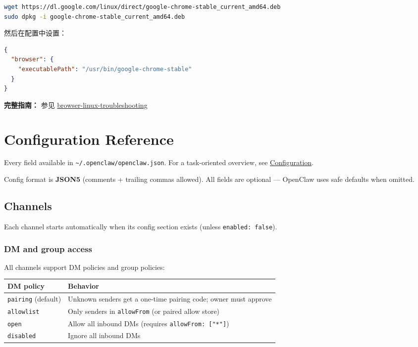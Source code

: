 \begin{lstlisting}[language=bash]
wget https://dl.google.com/linux/direct/google-chrome-stable_current_amd64.deb
sudo dpkg -i google-chrome-stable_current_amd64.deb
\end{lstlisting}


然后在配置中设置：

\begin{lstlisting}[language=json]
{
  "browser": {
    "executablePath": "/usr/bin/google-chrome-stable"
  }
}
\end{lstlisting}


\textbf{完整指南：} 参见 \href{/tools/browser-linux-troubleshooting}{browser-linux-troubleshooting}


\clearpage
\section{Configuration Reference}


Every field available in \texttt{\textasciitilde{}/.openclaw/openclaw.json}. For a task-oriented overview, see \href{/gateway/configuration}{Configuration}.

Config format is \textbf{JSON5} (comments + trailing commas allowed). All fields are optional — OpenClaw uses safe defaults when omitted.

\hrulefill


\subsection{Channels}


Each channel starts automatically when its config section exists (unless \texttt{enabled: false}).

\subsubsection{DM and group access}


All channels support DM policies and group policies:


\begin{table}[h]
\centering
\small
\begin{tabular}{|l|l|}
\hline
DM policy & Behavior \\
\hline
\texttt{pairing} (default) & Unknown senders get a one-time pairing code; owner must approve \\
\hline
\texttt{allowlist} & Only senders in \texttt{allowFrom} (or paired allow store) \\
\hline
\texttt{open} & Allow all inbound DMs (requires \texttt{allowFrom: ["*"]}) \\
\hline
\texttt{disabled} & Ignore all inbound DMs \\
\hline
\end{tabular}
\end{table}




